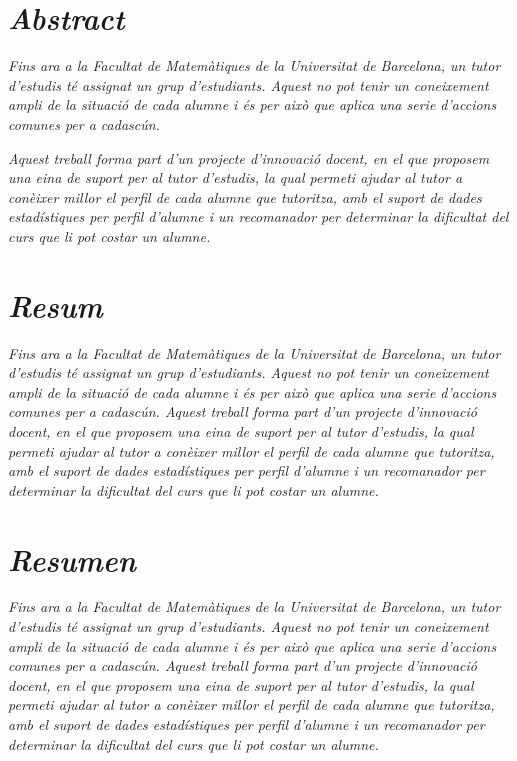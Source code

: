 \documentclass[12pt,a4paper,catalan]{article}
\begin{document}



\section*{\textit{Abstract}}


\textit{Fins ara a la Facultat de Matemàtiques de la Universitat de Barcelona, un tutor d'estudis té assignat un grup d'estudiants. Aquest no pot tenir un coneixement ampli de la situació de cada alumne i és per això que aplica una serie d'accions comunes per a cadascún.}

\textit{Aquest treball forma part d'un projecte d'innovació docent, en el que proposem una eina de suport per al tutor d'estudis, la qual permeti ajudar al tutor a conèixer millor el perfil de cada alumne que tutoritza, amb el suport de dades estadístiques per perfil d'alumne i un recomanador per determinar la dificultat del curs que li pot costar un alumne.}

\section*{\textit{Resum}}
\textit{Fins ara a la Facultat de Matemàtiques de la Universitat de Barcelona, un tutor d'estudis té assignat un grup d'estudiants. Aquest no pot tenir un coneixement ampli de la situació de cada alumne i és per això que aplica una serie d'accions comunes per a cadascún. Aquest treball forma part d'un projecte d'innovació docent, en el que proposem una eina de suport per al tutor d'estudis, la qual permeti ajudar al tutor a conèixer millor el perfil de cada alumne que tutoritza, amb el suport de dades estadístiques per perfil d'alumne i un recomanador per determinar la dificultat del curs que li pot costar un alumne.}


\section*{\textit{Resumen}}
\textit{Fins ara a la Facultat de Matemàtiques de la Universitat de Barcelona, un tutor d'estudis té assignat un grup d'estudiants. Aquest no pot tenir un coneixement ampli de la situació de cada alumne i és per això que aplica una serie d'accions comunes per a cadascún. Aquest treball forma part d'un projecte d'innovació docent, en el que proposem una eina de suport per al tutor d'estudis, la qual permeti ajudar al tutor a conèixer millor el perfil de cada alumne que tutoritza, amb el suport de dades estadístiques per perfil d'alumne i un recomanador per determinar la dificultat del curs que li pot costar un alumne.}
\end{document}

